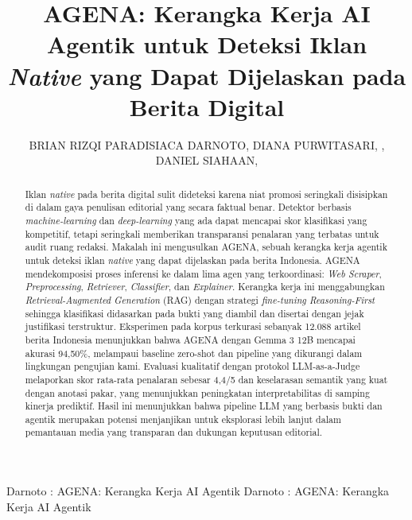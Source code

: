 \documentclass{ieeeaccess}
\begin{document}

\title{AGENA: Kerangka Kerja AI Agentik untuk Deteksi Iklan \textit{Native} yang Dapat Dijelaskan pada Berita Digital}
\author{\uppercase{Brian Rizqi Paradisiaca Darnoto, Diana Purwitasari, , Daniel Siahaan,
}}
\address[]{Departemen Informatika, Institut Teknologi Sepuluh Nopember, Surabaya, 60111, Indonesia}
\address[]{Informatika, Universitas Jember, Jember, 68121, Indonesia}

\markboth
{Darnoto \headeretal: AGENA: Kerangka Kerja AI Agentik}
{Darnoto \headeretal: AGENA: Kerangka Kerja AI Agentik}


\begin{abstract}
Iklan \textit{native} pada berita digital sulit dideteksi karena niat promosi seringkali disisipkan di dalam gaya penulisan editorial yang secara faktual benar. Detektor berbasis \textit{machine-learning} dan \textit{deep-learning} yang ada dapat mencapai skor klasifikasi yang kompetitif, tetapi seringkali memberikan transparansi penalaran yang terbatas untuk audit ruang redaksi. Makalah ini mengusulkan AGENA, sebuah kerangka kerja agentik untuk deteksi iklan \textit{native} yang dapat dijelaskan pada berita Indonesia. AGENA mendekomposisi proses inferensi ke dalam lima agen yang terkoordinasi: \textit{Web Scraper}, \textit{Preprocessing}, \textit{Retriever}, \textit{Classifier}, dan \textit{Explainer}. Kerangka kerja ini menggabungkan \textit{Retrieval-Augmented Generation} (RAG) dengan strategi \textit{fine-tuning Reasoning-First} sehingga klasifikasi didasarkan pada bukti yang diambil dan disertai dengan jejak justifikasi terstruktur. Eksperimen pada korpus terkurasi sebanyak 12.088 artikel berita Indonesia menunjukkan bahwa AGENA dengan Gemma 3 12B mencapai akurasi 94,50\%, melampaui baseline zero-shot dan pipeline yang dikurangi dalam lingkungan pengujian kami. Evaluasi kualitatif dengan protokol LLM-as-a-Judge melaporkan skor rata-rata penalaran sebesar 4,4/5 dan keselarasan semantik yang kuat dengan anotasi pakar, yang menunjukkan peningkatan interpretabilitas di samping kinerja prediktif. Hasil ini menunjukkan bahwa pipeline LLM yang berbasis bukti dan agentik merupakan potensi menjanjikan untuk eksplorasi lebih lanjut dalam pemantauan media yang transparan dan dukungan keputusan editorial.
\end{abstract}
\end{document}
